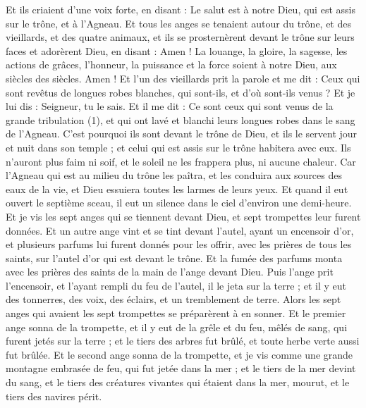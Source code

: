 \begin{multicols}{2}
Et ils criaient d’une voix forte, en disant : Le salut est à notre Dieu, qui est assis sur le trône, et à l'Agneau.
Et tous les anges se tenaient autour du trône, et des vieillards, et des quatre animaux, et ils se prosternèrent devant le trône sur leurs faces et adorèrent Dieu,
en disant : Amen ! La louange, la gloire, la sagesse, les actions de grâces, l’honneur, la puissance et la force soient à notre Dieu, aux siècles des siècles. Amen !
Et l’un des vieillards prit la parole et me dit : Ceux qui sont revêtus de longues robes blanches, qui sont-ils, et d'où sont-ils venus ?
Et je lui dis : Seigneur, tu le sais. Et il me dit : Ce sont ceux qui sont venus de la grande tribulation (1), et qui ont lavé et blanchi leurs longues robes dans le sang de l'Agneau.
C'est pourquoi ils sont devant le trône de Dieu, et ils le servent jour et nuit dans son temple ; et celui qui est assis sur le trône habitera avec eux.
Ils n'auront plus faim ni soif, et le soleil ne les frappera plus, ni aucune chaleur.
Car l'Agneau qui est au milieu du trône les paîtra, et les conduira aux sources des eaux de la vie, et Dieu essuiera toutes les larmes de leurs yeux.
\VerseOne{}Et quand il eut ouvert le septième sceau, il eut un silence dans le ciel d'environ une demi-heure.
Et je vis les sept anges qui se tiennent devant Dieu, et sept trompettes leur furent données.
Et un autre ange vint et se tint devant l'autel, ayant un encensoir d'or, et plusieurs parfums lui furent donnés pour les offrir, avec les prières de tous les saints, sur l'autel d'or qui est devant le trône.
Et la fumée des parfums monta avec les prières des saints de la main de l'ange devant Dieu.
Puis l'ange prit l'encensoir, et l'ayant rempli du feu de l'autel, il le jeta sur la terre ; et il y eut des tonnerres, des voix, des éclairs, et un tremblement de terre.
Alors les sept anges qui avaient les sept trompettes se préparèrent à en sonner.
Et le premier ange sonna de la trompette, et il y eut de la grêle et du feu, mêlés de sang, qui furent jetés sur la terre ; et le tiers des arbres fut brûlé, et toute herbe verte aussi fut brûlée.
Et le second ange sonna de la trompette, et je vis comme une grande montagne embrasée de feu, qui fut jetée dans la mer ; et le tiers de la mer devint du sang,
et le tiers des créatures vivantes qui étaient dans la mer, mourut, et le tiers des navires périt.

\end{multicols}
